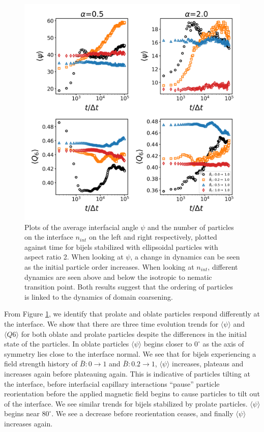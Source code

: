 \begin{figure} 
\centering 
\includegraphics[scale=0.4]{../figures/results/paper2/interface_angle-nint-field_up.png} 
\caption{Plots of the average interfacial angle $\psi$ and the number of particles on the interface $n_{int}$ on the left and right respectively, plotted against time for bijels stabilized with ellipsoidal particles with aspect ratio 2. When looking at $\psi$, a change in dynamics can be seen as the initial particle order increases. When looking at $n_{int}$, different dynamics are seen above and below the isotropic to nematic transition point. Both results suggest that the ordering of particles is linked to the dynamics of domain coarsening.} 
\label{fig:interface_angle-nint-field_up} 
\end{figure}

From Figure \ref{fig:interface_angle-nint-field_up}, we identify that
prolate and oblate particles respond differently at the interface. We
show that there are three time evolution trends for
\(\langle \psi \rangle\) and \(\langle Q6 \rangle\) for both oblate and
prolate particles despite the differences in the initial state of the
particles. In oblate particles \(\langle \psi \rangle\) begins closer to
\(0 ^{\circ}\) as the axis of symmetry lies close to the interface
normal. We see that for bijels experiencing a field strength history of
\(\bar{B}: 0 \rightarrow 1\) and \(\bar{B}: 0.2 \rightarrow 1\),
\(\langle \psi \rangle\) increases, plateaus and increases again before
plateauing again. This is indicative of particles tilting at the
interface, before interfacial capillary interactions ``pause'' particle
reorientation before the applied magnetic field begins to cause
particles to tilt out of the interface. We see similar trends for bijels
stabilized by prolate particles. \(\langle \psi \rangle\) begins near
\(80 ^{\circ}\). We see a decrease before reorientation ceases, and
finally \(\langle \psi \rangle\) increases again.

